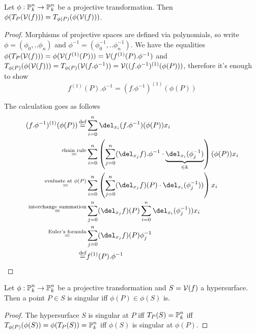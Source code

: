 \begin{proposition} \label{propositionTangentTransform}
Let $\phi : \operatorname{\mathbb P}^n_k \to \operatorname{\mathbb P}^n_k$ be a projective transformation.
Then $\phi(T_P(\operatorname{\mathcal V}(f))) = T_{\phi(P)}(\phi(\operatorname{\mathcal V}(f)))$.
\end{proposition}
\begin{proof}
Morphisms of projective spaces are defined via polynomials, so write  $\phi = (\phi_0,..\phi_n)$ and $\phi^{-1} = (\phi^{-1}_0,..\phi^{-1}_n)$.
We have the equalities $\phi(T_P(\operatorname{\mathcal V}(f))) = \phi(\operatorname{\mathcal V}(f^{(1)}(P))) = \operatorname{\mathcal V}(f^{(1)}(P).\phi^{-1})$ and $T_{\phi(P)}(\phi(\operatorname{\mathcal V}(f))) = T_{\phi(P)}(\operatorname{\mathcal V}(f.\phi^{-1})) = \operatorname{\mathcal V}((f.\phi^{-1})^{(1)}(\phi(P)))$, therefore it's enough to show
\begin{equation}
f^{(1)}(P).\phi^{-1} = (f.\phi^{-1})^{(1)}(\phi(P))
\end{equation}

The calculation goes as follows
\begin{align}
(f.\phi^{-1})^{(1)}(\phi(P))
  \defeq& \sum_{i=0}^n \del_{x_i}(f.\phi^{-1})(\phi(P))x_i
\\\overset{\text{chain rule}}=& \sum_{i=0}^n \left(\sum_{j=0}^n (\del_{x_j}f).\phi^{-1} \cdot \underset{\in k}{\underbrace{\del_{x_i}(\phi_j^{-1})}}\right)(\phi(P))x_i
\\\overset{\text{evaluate at }\phi(P)}=& \sum_{i=0}^n \left(\sum_{j=0}^n (\del_{x_j}f)(P) \cdot \del_{x_i}(\phi_j^{-1}))\right)x_i
\\\overset{\text{interchange summation}}=& \sum_{j=0}^n (\del_{x_j}f)(P) \sum_{i=0}^n \del_{x_i}(\phi_j^{-1}))x_i
\\\overset{\text{Euler's formula}}=& \sum_{j=0}^n (\del_{x_j}f)(P) \phi_j^{-1}
\\\defeq& f^{(1)}(P).\phi^{-1}
\end{align}
\end{proof}

\begin{corollary}
Let $\phi : \operatorname{\mathbb P}^n_k \to \operatorname{\mathbb P}^n_k$ be a projective transformation and $S = \operatorname{\mathcal V}(f)$ a hypersurface.
Then a point $P \in S$ is singular iff $\phi(P) \in \phi(S)$ is.
\end{corollary}
\begin{proof}
The hypersurface $S$ is singular at $P$ iff $T_P(S) = \operatorname{\mathbb P}^n_k$ iff $T_{\phi(P)}(\phi(S)) = \phi(T_P(S)) = \operatorname{\mathbb P}^n_k$ iff $\phi(S)$ is singular at $\phi(P)$.
\end{proof}

